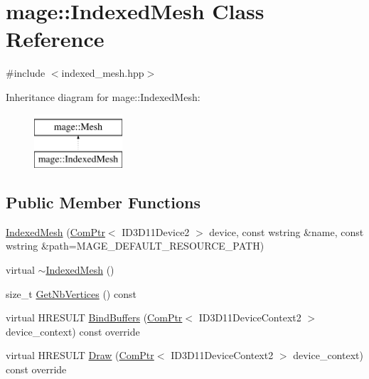 \hypertarget{classmage_1_1_indexed_mesh}{}\section{mage\+:\+:Indexed\+Mesh Class Reference}
\label{classmage_1_1_indexed_mesh}


{\ttfamily \#include $<$indexed\+\_\+mesh.\+hpp$>$}

Inheritance diagram for mage\+:\+:Indexed\+Mesh\+:\begin{figure}[H]
\begin{center}
\leavevmode
\includegraphics[height=2.000000cm]{classmage_1_1_indexed_mesh}
\end{center}
\end{figure}
\subsection*{Public Member Functions}
\begin{DoxyCompactItemize}
\item 
\hyperlink{classmage_1_1_indexed_mesh_a43a91dc83798d35e5e8bca948b87e223}{Indexed\+Mesh} (\hyperlink{namespacemage_ae74f374780900893caa5555d1031fd79}{Com\+Ptr}$<$ I\+D3\+D11\+Device2 $>$ device, const wstring \&name, const wstring \&path=M\+A\+G\+E\+\_\+\+D\+E\+F\+A\+U\+L\+T\+\_\+\+R\+E\+S\+O\+U\+R\+C\+E\+\_\+\+P\+A\+TH)
\item 
virtual \hyperlink{classmage_1_1_indexed_mesh_ac3b3d772e0760976f845830c9eb554e9}{$\sim$\+Indexed\+Mesh} ()
\item 
size\+\_\+t \hyperlink{classmage_1_1_indexed_mesh_ace923913f29e49a571c32b3fb76f6474}{Get\+Nb\+Vertices} () const
\item 
virtual H\+R\+E\+S\+U\+LT \hyperlink{classmage_1_1_indexed_mesh_a4043a771a1ffe461cfd876dd62f68212}{Bind\+Buffers} (\hyperlink{namespacemage_ae74f374780900893caa5555d1031fd79}{Com\+Ptr}$<$ I\+D3\+D11\+Device\+Context2 $>$ device\+\_\+context) const override
\item 
virtual H\+R\+E\+S\+U\+LT \hyperlink{classmage_1_1_indexed_mesh_a7067c08cb9165cef96f507b8dd9fe568}{Draw} (\hyperlink{namespacemage_ae74f374780900893caa5555d1031fd79}{Com\+Ptr}$<$ I\+D3\+D11\+Device\+Context2 $>$ device\+\_\+context) const override
\end{DoxyCompactItemize}
